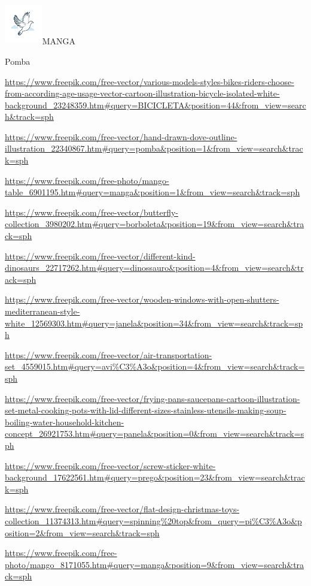 {{\includegraphics[width=0.65385in,height=0.73262in]{media/image66.png}MANGA

Pomba

\url{https://www.freepik.com/free-vector/various-models-styles-bikes-riders-choose-from-according-age-usage-vector-cartoon-illustration-bicycle-isolated-white-background_23248359.htm\#query=BICICLETA\&position=44\&from_view=search\&track=sph}

\url{https://www.freepik.com/free-vector/hand-drawn-dove-outline-illustration_22340867.htm\#query=pomba\&position=1\&from_view=search\&track=sph}

\url{https://www.freepik.com/free-photo/mango-table_6901195.htm\#query=manga\&position=1\&from_view=search\&track=sph}

\url{https://www.freepik.com/free-vector/butterfly-collection_3980202.htm\#query=borboleta\&position=19\&from_view=search\&track=sph}

\url{https://www.freepik.com/free-vector/different-kind-dinosaurs_22717262.htm\#query=dinossauro\&position=4\&from_view=search\&track=sph}

\url{https://www.freepik.com/free-vector/wooden-windows-with-open-shutters-mediterranean-style-white_12569303.htm\#query=janela\&position=34\&from_view=search\&track=sph}

\url{https://www.freepik.com/free-vector/air-transportation-set_4559015.htm\#query=avi\%C3\%A3o\&position=4\&from_view=search\&track=sph}

\url{https://www.freepik.com/free-vector/frying-pans-saucepans-cartoon-illustration-set-metal-cooking-pots-with-lid-different-sizes-stainless-utensils-making-soup-boiling-water-household-kitchen-concept_26921753.htm\#query=panela\&position=0\&from_view=search\&track=sph}

\url{https://www.freepik.com/free-vector/screw-sticker-white-background_17622561.htm\#query=prego\&position=23\&from_view=search\&track=sph}

\url{https://www.freepik.com/free-vector/flat-design-christmas-toys-collection_11374313.htm\#query=spinning\%20top\&from_query=pi\%C3\%A3o\&position=2\&from_view=search\&track=sph}

\url{https://www.freepik.com/free-photo/mango_8171055.htm\#query=manga\&position=9\&from_view=search\&track=sph}

}}
